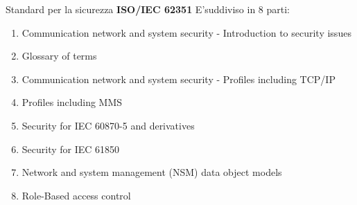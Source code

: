 \begin{frame}{Standard per la sicurezza}
	\textbf{ISO/IEC 62351}
	\newline
	E'suddiviso in 8 parti:
	\begin{enumerate}[<+- | alert@+>]
		\item Communication network and system security - Introduction to security issues
		\item Glossary of terms
		\item Communication network and system security - Profiles including TCP/IP
		\item Profiles including MMS
		\item Security for IEC 60870-5 and derivatives
		\item Security for IEC 61850
		\item Network and system management (NSM) data object models
		\item Role-Based access control
	\end{enumerate}
\end{frame}